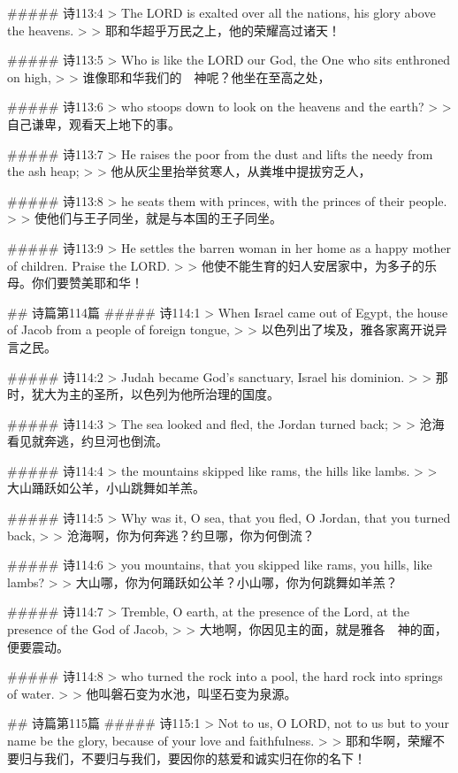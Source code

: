 ##### 诗113:4
> The LORD is exalted over all the nations, his glory above the heavens.
>
> 耶和华超乎万民之上，他的荣耀高过诸天！


##### 诗113:5
> Who is like the LORD our God, the One who sits enthroned on high,
>
> 谁像耶和华我们的　神呢？他坐在至高之处，


##### 诗113:6
> who stoops down to look on the heavens and the earth?
>
> 自己谦卑，观看天上地下的事。


##### 诗113:7
> He raises the poor from the dust and lifts the needy from the ash heap;
>
> 他从灰尘里抬举贫寒人，从粪堆中提拔穷乏人，


##### 诗113:8
> he seats them with princes, with the princes of their people.
>
> 使他们与王子同坐，就是与本国的王子同坐。


##### 诗113:9
> He settles the barren woman in her home as a happy mother of children. Praise the LORD.
>
> 他使不能生育的妇人安居家中，为多子的乐母。你们要赞美耶和华！


## 诗篇第114篇
##### 诗114:1
> When Israel came out of Egypt, the house of Jacob from a people of foreign tongue,
>
> 以色列出了埃及，雅各家离开说异言之民。


##### 诗114:2
> Judah became God's sanctuary, Israel his dominion.
>
> 那时，犹大为主的圣所，以色列为他所治理的国度。


##### 诗114:3
> The sea looked and fled, the Jordan turned back;
>
> 沧海看见就奔逃，约旦河也倒流。


##### 诗114:4
> the mountains skipped like rams, the hills like lambs.
>
> 大山踊跃如公羊，小山跳舞如羊羔。


##### 诗114:5
> Why was it, O sea, that you fled, O Jordan, that you turned back,
>
> 沧海啊，你为何奔逃？约旦哪，你为何倒流？


##### 诗114:6
> you mountains, that you skipped like rams, you hills, like lambs?
>
> 大山哪，你为何踊跃如公羊？小山哪，你为何跳舞如羊羔？


##### 诗114:7
> Tremble, O earth, at the presence of the Lord, at the presence of the God of Jacob,
>
> 大地啊，你因见主的面，就是雅各　神的面，便要震动。


##### 诗114:8
> who turned the rock into a pool, the hard rock into springs of water.
>
> 他叫磐石变为水池，叫坚石变为泉源。


## 诗篇第115篇
##### 诗115:1
> Not to us, O LORD, not to us but to your name be the glory, because of your love and faithfulness.
>
> 耶和华啊，荣耀不要归与我们，不要归与我们，要因你的慈爱和诚实归在你的名下！



